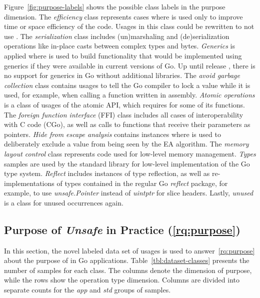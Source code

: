 



Figure~\ref{fig:purpose-labels} shows the possible class labels in the purpose dimension.
The \textit{efficiency} class represents cases where \unsafe{} is used only to improve time or
space efficiency of the code.
Usages in this class could be rewritten to not use \unsafe{}.
The \textit{serialization} class includes (un)marshaling and (de)serialization operations like in-place casts between
complex types and bytes.
\textit{Generics} is applied where \unsafe{} is used to build functionality that would be implemented using generics if
they were available in current versions of Go.
Up until release , there is no support for generics in Go without additional libraries.
The \textit{avoid garbage collection} class contains usages to tell the Go compiler to lock a value while it is used,
for example, when calling a function written in assembly.
\textit{Atomic operations} is a class of usages of the atomic \acrshort{API}, which requires \unsafe{} for some of its
functions.
The \textit{foreign function interface} (\acrshort{FFI}) class includes all cases of interoperability with C code (CGo),
as well as calls to functions that receive their parameters as \unsafe{} pointers.
\textit{Hide from escape analysis} contains instances where \unsafe{} is used to deliberately exclude a value from being
seen by the \acrshort{EA} algorithm.
The \textit{memory layout control} class represents code used for low-level memory management.
\textit{Types} samples are used by the standard library for low-level implementation of the Go type system.
\textit{Reflect} includes instances of type reflection, as well as re-implementations of types contained in the regular
Go \textit{reflect} package, for example, to use \textit{unsafe.Pointer} instead of \textit{uintptr} for slice headers.
Lastly, \textit{unused} is a class for unused occurrences again.



\subsection{Purpose of \textit{Unsafe} in Practice (\ref{rq:purpose})}\label{subsec:go-geiger:qualitative-evaluation:purpose}

In this section, the novel labeled data set of \unsafe{} usages is used to answer~\ref{rq:purpose} about the purpose of
\unsafe{} in Go applications.
Table~\ref{tbl:dataset-classes} presents the number of samples for each class.
The columns denote the dimension of purpose, while the rows show the operation type dimension.
Columns are divided into separate counts for the \textit{app} and \textit{std} groups of samples.

